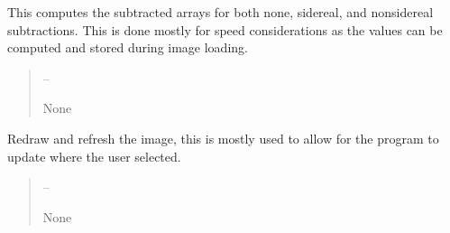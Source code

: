 \documentclass[letterpaper,11pt,english]{sphinxmanual}
\begin{document}
\begin{savenotes}
\begin{fulllineitems}
\begin{savenotes}\begin{fulllineitems}
\label{\detokenize{code/opihiexarata.gui.selector:opihiexarata.gui.selector.TargetSelectorWindow._recompute_subtraction_arrays}}
\pysigstartsignatures
{}
\pysigstopsignatures
\sphinxAtStartPar
This computes the subtracted arrays for both none, sidereal, and
non\sphinxhyphen{}sidereal subtractions. This is done mostly for speed considerations
as the values can be computed and stored during image loading.
\begin{quote}\begin{description}
\sphinxAtStartPar
{} – 

\sphinxAtStartPar
None

\end{description}\end{quote}

\end{fulllineitems}\end{savenotes}


\begin{savenotes}\begin{fulllineitems}
\label{\detokenize{code/opihiexarata.gui.selector:opihiexarata.gui.selector.TargetSelectorWindow._refresh_image}}
\pysigstartsignatures
{}
\pysigstopsignatures
\sphinxAtStartPar
Redraw and refresh the image, this is mostly used to allow for the
program to update where the user selected.
\begin{quote}\begin{description}
\sphinxAtStartPar
{} – 

\sphinxAtStartPar
None

\end{description}\end{quote}

\end{fulllineitems}\end{savenotes}


\end{fulllineitems}
\end{savenotes}
\end{document}
